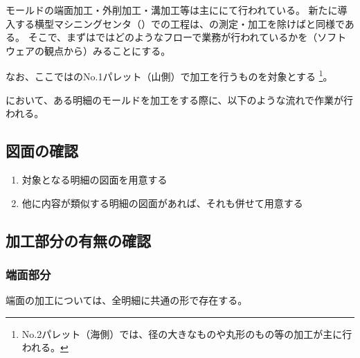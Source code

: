 

モールドの端面加工・外削加工・溝加工等は主に\MMname にて行われている。
新たに導入する横型マシニングセンタ（\DMname）での工程は、\dimple の測定・加工を除けば\MMname と同様である。
そこで、まずは\MMname ではどのようなフローで業務が行われているかを（ソフトウェアの観点から）みることにする。

なお、ここでは\MMname のNo.1パレット（山側）で加工を行うものを対象とする
\footnote{No.2パレット（海側）では、径の大きなものや丸形のもの等の加工が主に行われる。}。



\MMname において、ある明細のモールドを加工をする際に、以下のような流れで作業が行われる。


\subsection{図面の確認}
\begin{enumerate}
\item 対象となる明細の図面を用意する
\item 他に内容が類似する明細の図面があれば、それも併せて用意する
\end{enumerate}


\subsection{加工部分の有無の確認}

\subsubsection{端面部分}
端面の加工については、全明細に共通の形で存在する。

